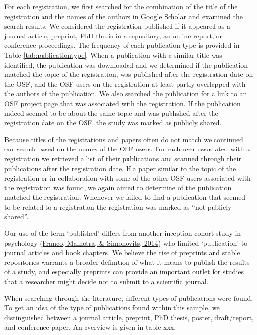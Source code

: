 \documentclass[
  ,jou, a4paper,floatsintext]{apa6}
\begin{document}
For each registration, we first searched for the combination of the title of the registration and the names of the authors in Google Scholar and examined the search results. We considered the registration published if it appeared as a journal article, preprint, PhD thesis in a repository, an online report, or conference proceedings. The frequency of each publication type is provided in Table \ref{tab:publicationtype}. When a publication with a similar title was identified, the publication was downloaded and we determined if the publication matched the topic of the registration, was published after the registration date on the OSF, and the OSF users on the registration at least partly overlapped with the authors of the publication. We also searched the publication for a link to an OSF project page that was associated with the registration. If the publication indeed seemed to be about the same topic and was published after the registration date on the OSF, the study was marked as publicly shared.

Because titles of the registrations and papers often do not match we continued our search based on the names of the OSF users. For each user associated with a registration we retrieved a list of their publications and scanned through their publications after the registration date. If a paper similar to the topic of the registration or in collaboration with some of the other OSF users associated with the registration was found, we again aimed to determine of the publication matched the registration. Whenever we failed to find a publication that seemed to be related to a registration the registration was marked as ``not publicly shared''.

Our use of the term `published' differs from another inception cohort study in psychology (\protect\hyperlink{ref-franco_publication_2014}{Franco, Malhotra, \& Simonovits, 2014}) who limited `publication' to journal articles and book chapters. We believe the rise of preprints and stable repositories warrants a broader definition of what it means to publish the results of a study, and especially preprints can provide an important outlet for studies that a researcher might decide not to submit to a scientific journal.

When searching through the literature, different types of publications were found. To get an idea of the type of publications found within this sample, we distinguished between a journal article, preprint, PhD thesis, poster, draft/report, and conference paper. An overview is given in table xxx.
\end{document}
